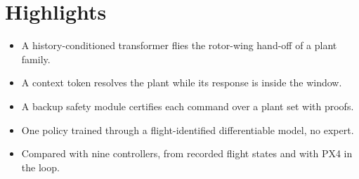 \documentclass{article}\usepackage[margin=2.5cm]{geometry}\pagestyle{empty}
\begin{document}
\section*{Highlights}
\begin{itemize}
\item A history-conditioned transformer flies the rotor-wing hand-off of a plant family.
\item A context token resolves the plant while its response is inside the window.
\item A backup safety module certifies each command over a plant set with proofs.
\item One policy trained through a flight-identified differentiable model, no expert.
\item Compared with nine controllers, from recorded flight states and with PX4 in the loop.
\end{itemize}
\end{document}
